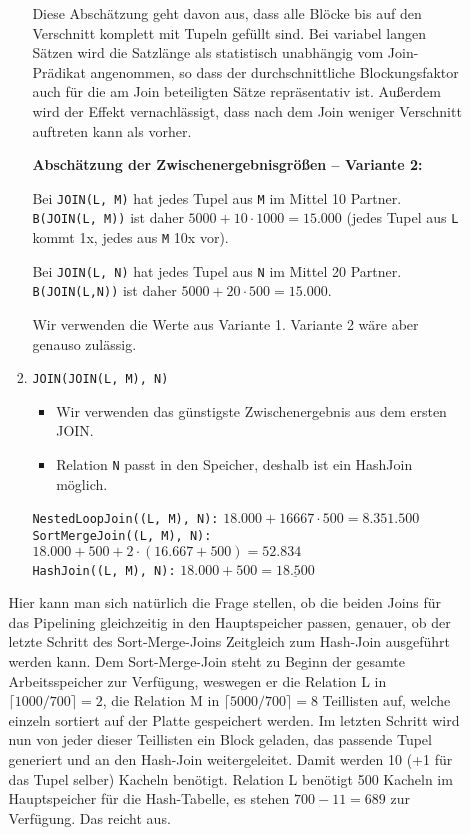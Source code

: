 \begin{enumerate}[a)]
\begin{enumerate}[i)]
\begin{solution}
\begin{enumerate}[1.]
			  Diese Abschätzung geht davon aus, dass alle Blöcke bis auf den Verschnitt komplett mit Tupeln gefüllt sind.
			  Bei variabel langen Sätzen wird die Satzlänge als statistisch unabhängig vom Join-Prädikat angenommen, so dass der durchschnittliche Blockungsfaktor auch für die am Join beteiligten Sätze repräsentativ ist.
			  Außerdem wird der Effekt vernachlässigt, dass nach dem Join weniger Verschnitt auftreten kann als vorher.

			  \textbf{Abschätzung der Zwischenergebnisgrößen -- Variante 2:}

			  Bei \texttt{JOIN(L, M)} hat jedes Tupel aus \texttt{M} im Mittel 10 Partner.
			  \texttt{B(JOIN(L, M))} ist daher $5000+10 \cdot 1000 = 15.000$ (jedes Tupel aus \texttt{L} kommt 1x, jedes aus \texttt{M} 10x vor).

			  Bei \texttt{JOIN(L, N)} hat jedes Tupel aus \texttt{N} im Mittel 20 Partner.
			  \texttt{B(JOIN(L,N))} ist daher $5000+20 \cdot 500 = 15.000$.

			  Wir verwenden die Werte aus Variante 1.
			  Variante 2 wäre aber genauso zulässig.

			\item \texttt{JOIN(JOIN(L, M), N)}
			  \begin{itemize}
				  \item Wir verwenden das günstigste Zwischenergebnis aus dem ersten JOIN.
				  \item Relation \texttt{N} passt in den Speicher, deshalb ist ein HashJoin möglich.
			  \end{itemize}

			  \texttt{NestedLoopJoin((L, M), N):} $18.000 + 16667 \cdot 500 = 8.351.500$ \\
			  \texttt{SortMergeJoin((L, M), N):} $18.000 + 500 + 2 \cdot (16.667 + 500) = 52.834$ \\
			  \texttt{HashJoin((L, M), N):} $18.000 + 500 = \underline{18.500}$ \\

		\end{enumerate}

		Hier kann man sich natürlich die Frage stellen, ob die beiden Joins für das Pipelining gleichzeitig in den Hauptspeicher passen, genauer, ob der letzte Schritt des Sort-Merge-Joins Zeitgleich zum Hash-Join ausgeführt werden kann.
		Dem Sort-Merge-Join steht zu Beginn der gesamte Arbeitsspeicher zur Verfügung, weswegen er die Relation L in $\lceil 1000/700\rceil = 2$, die Relation M in $\lceil 5000 / 700 \rceil = 8$ Teillisten auf, welche einzeln sortiert auf der Platte gespeichert werden.
		Im letzten Schritt wird nun von jeder dieser Teillisten ein Block geladen, das passende Tupel generiert und an den Hash-Join weitergeleitet.
		Damit werden 10 (+1 für das Tupel selber) Kacheln benötigt.
		Relation L benötigt 500 Kacheln im Hauptspeicher für die Hash-Tabelle, es stehen $700-11=689$ zur Verfügung.
		Das reicht aus.


\end{solution}
\end{enumerate}
\end{enumerate}
